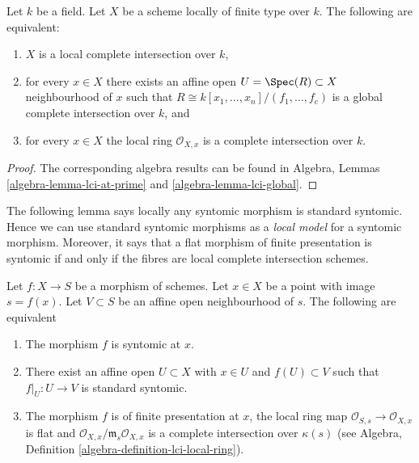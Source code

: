 \begin{lemma}
\label{lemma-local-complete-intersection}
Let $k$ be a field.
Let $X$ be a scheme locally of finite type over $k$.
The following are equivalent:
\begin{enumerate}
\item $X$ is a local complete intersection over $k$,
\item for every $x \in X$ there exists an affine open
$U = \Spec(R) \subset X$ neighbourhood of $x$
such that $R \cong k[x_1, \ldots, x_n]/(f_1, \ldots, f_c)$
is a global complete intersection over $k$, and
\item for every $x \in X$ the local ring $\mathcal{O}_{X, x}$
is a complete intersection over $k$.
\end{enumerate}
\end{lemma}

\begin{proof}
The corresponding algebra results can be found in
Algebra, Lemmas \ref{algebra-lemma-lci-at-prime} and
\ref{algebra-lemma-lci-global}.
\end{proof}

\noindent
The following lemma says locally any syntomic morphism is standard syntomic.
Hence we can use standard syntomic morphisms as a {\it local model}
for a syntomic morphism. Moreover, it says that a flat morphism of finite
presentation is syntomic if and only if the fibres are local complete
intersection schemes.

\begin{lemma}
\label{lemma-syntomic-locally-standard-syntomic}
Let $f : X  \to S$ be a morphism of schemes. Let $x \in X$ be a point
with image $s = f(x)$. Let $V \subset S$ be an affine open neighbourhood
of $s$. The following are equivalent
\begin{enumerate}
\item The morphism $f$ is syntomic at $x$.
\item There exist an affine open $U \subset X$ with $x \in U$ and
$f(U) \subset V$ such that $f|_U : U \to V$ is standard syntomic.
\item The morphism $f$ is of finite presentation at $x$, the local ring map
$\mathcal{O}_{S, s} \to \mathcal{O}_{X, x}$
is flat and $\mathcal{O}_{X, x}/\mathfrak m_s \mathcal{O}_{X, x}$
is a complete intersection over $\kappa(s)$ (see
Algebra, Definition \ref{algebra-definition-lci-local-ring}).
\end{enumerate}
\end{lemma}

